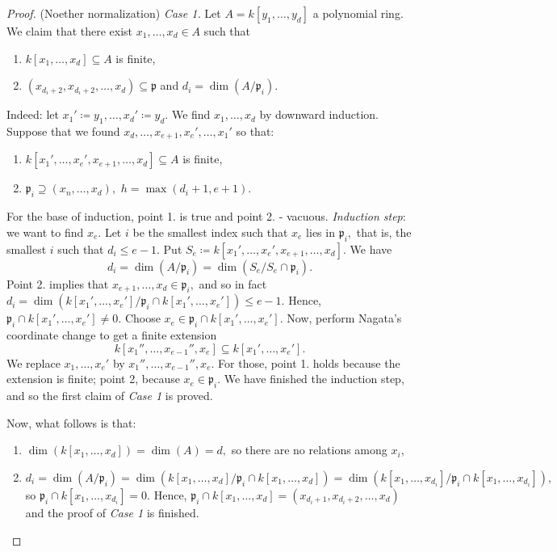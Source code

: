 \begin{proof}(Noether normalization)
  \emph{Case 1.} Let \(A = k[y_1, \dotsc, y_d]\) a polynomial ring. We claim that there exist \(x_1, \dotsc, x_d \in A\) such that
  \begin{enumerate}
  \item \(k[x_1, \dotsc, x_d] \subseteq A\) is finite,
  \item \((x_{d_i+2}, x_{d_i+2}, \dotsc, x_d) \subseteq \mathfrak p\) and \(d_i = \dim (A/{\mathfrak p_i}).\)
  \end{enumerate}
  Indeed: let \(x_1' \coloneqq y_1, \dotsc, x_d' \coloneqq y_d.\)
  We find \(x_1, \dotsc, x_d\) by downward induction.
  Suppose that we found
  \(x_d, \dotsc, x_{e+1}, x_e', \dotsc, x_1'\) so that:
  \begin{enumerate}
  \item \(k[x_1', \dotsc, x_e', x_{e+1}, \dotsc, x_d] \subseteq A\) is finite,
  \item \(\mathfrak p_i \supseteq (x_n, \dotsc, x_d),\) \(h = \max(d_i+1, e + 1).\)
  \end{enumerate}
  For the base of induction, point 1. is true and point 2. - vacuous.
  \emph{Induction step}: we want to find \(x_e.\)
  Let \(i\) be the smallest index such that \(x_e\) lies in \(\mathfrak p_i,\) that is, the smallest \(i\) such that
  \(d_i \leq e - 1.\)
  Put
  \(S_e \coloneqq k[x_1', \dotsc, x_e', x_{e+1}, \dotsc, x_d].\)
  We have
  \[d_i = \dim(A/{\mathfrak p_i}) = \dim(S_e/{S_e \cap \mathfrak p_i}).\]
  Point 2. implies that
  \(x_{e+1}, \dotsc, x_d \in \mathfrak p_i,\)
  and so in fact
  \(d_i = \dim(k[x_1', \dotsc, x_e']/{\mathfrak p_i \cap k[x_1', \dotsc, x_e']}) \leq e - 1.\)
  Hence,
  \(\mathfrak p_i \cap k[x_1', \dotsc, x_e'] \neq 0.\)
  Choose
  \(x_e \in \mathfrak p_i \cap k[x_1', \dotsc, x_e'].\)
  Now, perform Nagata's coordinate change to get a finite extension
  \[k[x_1'', \dotsc, x_{e-1}'', x_e] \subseteq k[x_1', \dotsc, x_e'].\]
  We replace \(x_1, \dotsc, x_e'\) by \(x_1'', \dotsc, x_{e-1}'', x_e.\)
  For those, point 1. holds because the extension is finite; point 2, because \(x_e \in \mathfrak p_i.\)
  We have finished the induction step, and so the first claim of \emph{Case 1} is proved.

  Now, what follows is that:
  \begin{enumerate}
    \item \(\dim(k[x_1, \dotsc, x_d]) = \dim(A) = d,\)
      so there are no relations among \(x_i\),
    \item \(d_i = \dim(A/{\mathfrak p_i}) = \dim(k[x_1, \dotsc, x_d]/{\mathfrak p_i \cap k[x_1, \dotsc, x_d]}) = \dim(k[x_1, \dotsc, x_{d_i}]/{\mathfrak p_i \cap k[x_1, \dotsc, x_{d_i}]}),\)
      so \(\mathfrak p_i \cap k[x_1, \dotsc, x_{d_i}] = 0.\)
      Hence, \(\mathfrak p_i \cap k[x_1, \dotsc, x_d] = (x_{d_i+1}, x_{d_i+2}, \dotsc, x_d)\) and the proof of \emph{Case 1} is finished.
  \end{enumerate}


\end{proof}
